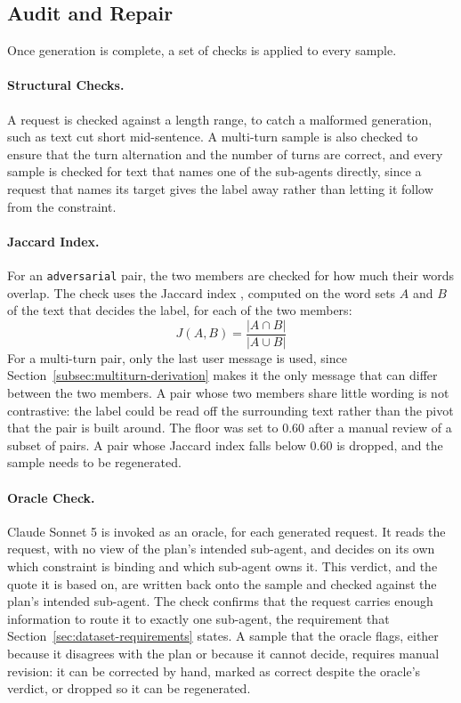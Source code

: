 \subsection{Audit and Repair}
\label{subsec:pipeline-audit-repair}

Once generation is complete, a set of checks is applied to every sample.

\paragraph{Structural Checks.} A request is checked against a length range, to catch a malformed generation, such as text cut short mid-sentence. A multi-turn sample is also checked to ensure that the turn alternation and the number of turns are correct, and every sample is checked for text that names one of the sub-agents directly, since a request that names its target gives the label away rather than letting it follow from the constraint.

\paragraph{Jaccard Index.} For an \texttt{adversarial} pair, the two members are checked for how much their words overlap. The check uses the Jaccard index \cite{nobleWhatJaccardSimilarity2026}, computed on the word sets $A$ and $B$ of the text that decides the label, for each of the two members:
\begin{equation}
    J(A, B) = \frac{|A \cap B|}{|A \cup B|}
\end{equation}
For a multi-turn pair, only the last user message is used, since Section~\ref{subsec:multiturn-derivation} makes it the only message that can differ between the two members. A pair whose two members share little wording is not contrastive: the label could be read off the surrounding text rather than the pivot that the pair is built around. The floor was set to 0.60 after a manual review of a subset of pairs. A pair whose Jaccard index falls below 0.60 is dropped, and the sample needs to be regenerated.

\paragraph{Oracle Check.} Claude Sonnet 5 is invoked as an oracle, for each generated request. It reads the request, with no view of the plan's intended sub-agent, and decides on its own which constraint is binding and which sub-agent owns it. This verdict, and the quote it is based on, are written back onto the sample and checked against the plan's intended sub-agent. The check confirms that the request carries enough information to route it to exactly one sub-agent, the requirement that Section~\ref{sec:dataset-requirements} states. A sample that the oracle flags, either because it disagrees with the plan or because it cannot decide, requires manual revision: it can be corrected by hand, marked as correct despite the oracle's verdict, or dropped so it can be regenerated.

